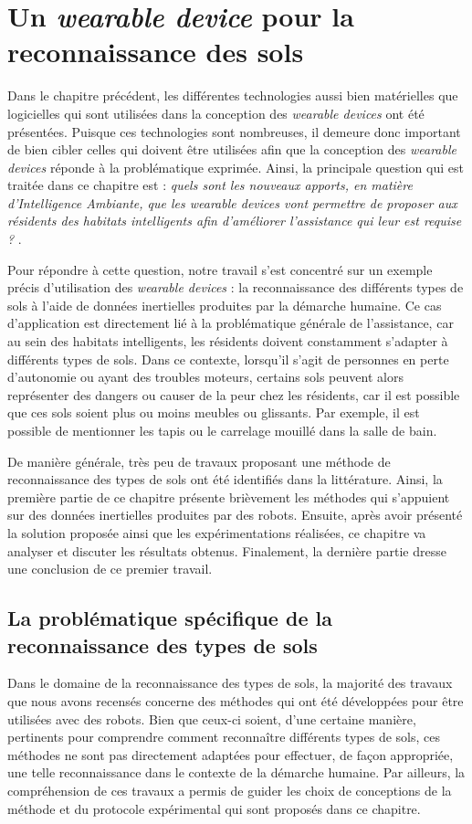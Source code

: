 \chapter{Un \textit{wearable device} pour la reconnaissance des sols}
\label{chap:4}

Dans le chapitre précédent, les différentes technologies aussi bien matérielles que logicielles qui sont utilisées dans la conception des \textit{wearable devices} ont été présentées. Puisque ces technologies sont nombreuses, il demeure donc important de bien cibler celles qui doivent être utilisées afin que la conception des \textit{wearable devices} réponde à la problématique exprimée. Ainsi, la principale question qui est traitée dans ce chapitre est : \textit{\og quels sont les nouveaux apports, en matière d'Intelligence Ambiante, que les wearable devices vont permettre de proposer aux résidents des habitats intelligents afin d'améliorer l'assistance qui leur est requise ? \fg}.

Pour répondre à cette question, notre travail s'est concentré sur un exemple précis d'utilisation des \textit{wearable devices} : la reconnaissance des différents types de sols à l'aide de données inertielles produites par la démarche humaine. Ce cas d'application est directement lié à la problématique générale de l'assistance, car au sein des habitats intelligents, les résidents doivent constamment s'adapter à différents types de sols. Dans ce contexte, lorsqu'il s'agit de personnes en perte d'autonomie ou ayant des troubles moteurs, certains sols peuvent alors représenter des dangers ou causer de la peur chez les résidents, car il est possible que ces sols soient plus ou moins meubles ou glissants. Par exemple, il est possible de mentionner les tapis ou le carrelage mouillé dans la salle de bain.

De manière générale, très peu de travaux proposant une méthode de reconnaissance des types de sols ont été identifiés dans la littérature. Ainsi, la première partie de ce chapitre présente brièvement les méthodes qui s'appuient sur des données inertielles produites par des robots. Ensuite, après avoir présenté la solution proposée ainsi que les expérimentations réalisées, ce chapitre va analyser et discuter les résultats obtenus. Finalement, la dernière partie dresse une conclusion de ce premier travail.

\section{La problématique spécifique de la reconnaissance des types de sols}
\label{sec:rw}
Dans le domaine de la reconnaissance des types de sols, la majorité des travaux que nous avons recensés concerne des méthodes qui ont été développées pour être utilisées avec des robots. Bien que ceux-ci soient, d'une certaine manière, pertinents pour comprendre comment reconnaître différents types de sols, ces méthodes ne sont pas directement adaptées pour effectuer, de façon appropriée, une telle reconnaissance dans le contexte de la démarche humaine. Par ailleurs, la compréhension de ces travaux a permis de guider les choix de conceptions de la méthode et du protocole expérimental qui sont proposés dans ce chapitre.

